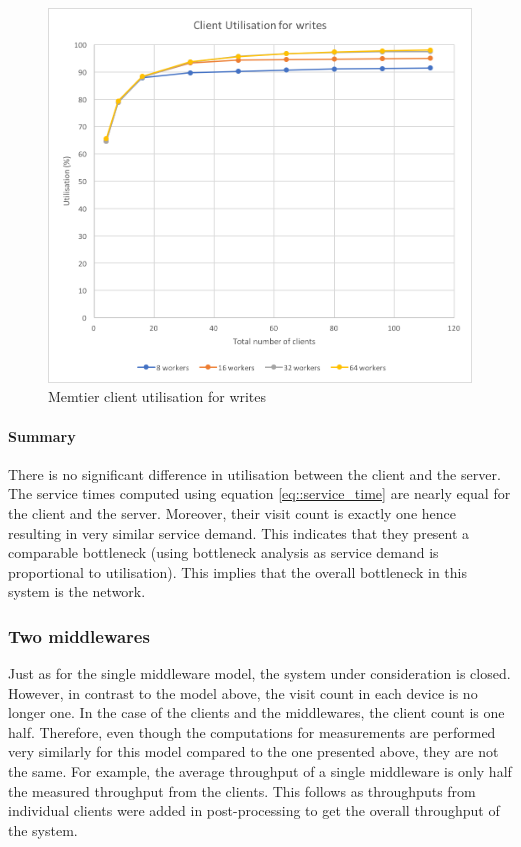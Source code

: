 \documentclass[11pt,a4paper]{article}
\begin{document}
\begin{figure}[!h]
\begin{minipage}[b]{.45\textwidth}
        \includegraphics[width=\textwidth]{processing/graphics/q_network_clt_util_1mw_writes.png}
        \caption{Memtier client utilisation for writes}
        \label{png::q_network_clt_util_1mw_writes}
    \end{minipage}
\end{figure}

\paragraph{Summary}
There is no significant difference in utilisation between the client and the server. The service times computed using equation \ref{eq::service_time} are nearly equal for the client and the server. Moreover, their visit count is exactly one hence resulting in very similar service demand. This indicates that they present a comparable bottleneck (using bottleneck analysis as service demand is proportional to utilisation). This implies that the overall bottleneck in this system is the network.


\subsubsection{Two middlewares}
Just as for the single middleware model, the system under consideration is closed. However, in contrast to the model above, the visit count in each device is no longer one. In the case of the clients and the middlewares, the client count is one half. Therefore, even though the computations for measurements are performed very similarly for this model compared to the one presented above, they are not the same. For example, the average throughput of a single middleware is only half the measured throughput from the clients. This follows as throughputs from individual clients were added in post-processing to get the overall throughput of the system.
\end{document}
